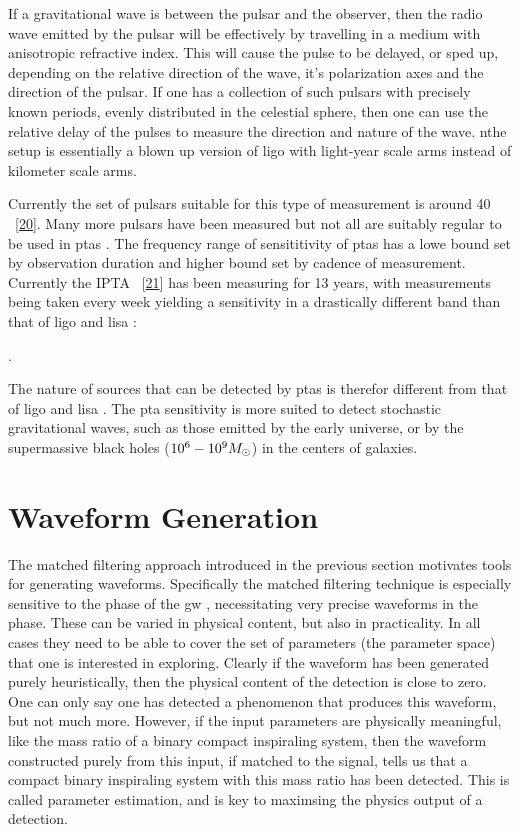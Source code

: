 \documentclass[
  10pt,
  a4paper,
  DIV=11,
  numbers=noendperiod,
  twoside]{scrreprt}
\let\[\relax \let\]\relax %
\DeclareRobustCommand{\[}{\begin{equation}}
\DeclareRobustCommand{\]}{\end{equation}}
\begin{document}
If a gravitational wave is between the pulsar and the observer, then the
radio wave emitted by the pulsar will be effectively by travelling in a
medium with anisotropic refractive index. This will cause the pulse to
be delayed, or sped up, depending on the relative direction of the wave,
it's polarization axes and the direction of the pulsar. If one has a
collection of such pulsars with precisely known periods, evenly
distributed in the celestial sphere, then one can use the relative delay
of the pulses to measure the direction and nature of the wave. nthe
setup is essentially a blown up version of \gls{ligo} with light-year
scale arms instead of kilometer scale arms.

Currently the set of pulsars suitable for this type of measurement is
around 40 ~{[}\protect\hyperlink{ref-Maiorano:2021}{20}{]}. Many more
pulsars have been measured but not all are suitably regular to be used
in \glspl{pta} . The frequency range of sensititivity of \glspl{pta} has
a lowe bound set by observation duration and higher bound set by cadence
of measurement. Currently the IPTA
~{[}\protect\hyperlink{ref-Hobbs:2009yy}{21}{]} has been measuring for
13 years, with measurements being taken every week yielding a
sensitivity in a drastically different band than that of \gls{ligo} and
\gls{lisa} :

\[
.
\]

The nature of sources that can be detected by \glspl{pta} is therefor
different from that of \gls{ligo} and \gls{lisa} . The \gls{pta}
sensitivity is more suited to detect stochastic gravitational waves,
such as those emitted by the early universe, or by the supermassive
black holes (\(10^6-10^9M_\odot\)) in the centers of
galaxies.


\hypertarget{sec-wfgen}{%
\chapter{Waveform Generation}\label{sec-wfgen}}

The matched filtering approach introduced in the previous section
motivates tools for generating waveforms. Specifically the matched
filtering technique is especially sensitive to the phase of the \gls{gw}
, necessitating very precise waveforms in the phase. These can be varied
in physical content, but also in practicality. In all cases they need to
be able to cover the set of parameters (the parameter space) that one is
interested in exploring. Clearly if the waveform has been generated
purely heuristically, then the physical content of the detection is
close to zero. One can only say one has detected a phenomenon that
produces this waveform, but not much more. However, if the input
parameters are physically meaningful, like the mass ratio of a binary
compact inspiraling system, then the waveform constructed purely from
this input, if matched to the signal, tells us that a compact binary
inspiraling system with this mass ratio has been detected. This is
called parameter estimation, and is key to maximsing the physics output
of a detection.
\end{document}
